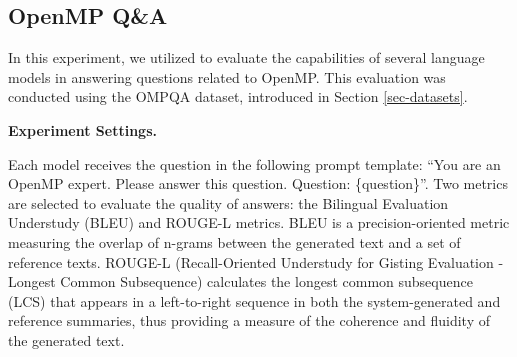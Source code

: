 \subsection{OpenMP Q\&A}
 In this experiment, we utilized \ourwork to evaluate the capabilities of several language models in answering questions related to OpenMP. This evaluation was conducted using the OMPQA dataset, introduced in Section \ref{sec-datasets}. 

\textbf{Experiment Settings.} 


Each model receives the question in the following prompt template:
``You are an OpenMP expert. Please answer this question. Question: \{question\}''. Two metrics are selected to evaluate the quality of answers: the Bilingual Evaluation Understudy (BLEU) and ROUGE-L metrics. BLEU is a precision-oriented metric measuring the overlap of n-grams between the generated text and a set of reference texts. 
ROUGE-L (Recall-Oriented Understudy for Gisting Evaluation - Longest Common Subsequence) calculates the longest common subsequence (LCS) that appears in a left-to-right sequence in both the system-generated and reference summaries, thus providing a measure of the coherence and fluidity of the generated text.

